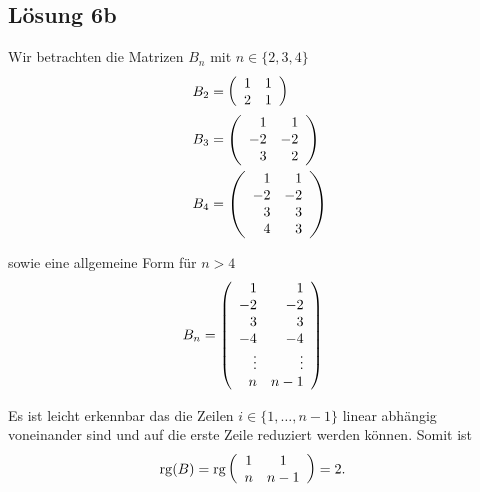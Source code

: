 \documentclass[main.tex]{subfiles}
\begin{document}
\subsection{Lösung 6b}

Wir betrachten die Matrizen $B_n$ mit $n\in \{2, 3, 4\}$
\begin{align*}
    B_2 &= \eqmatrix{rr}{
        1 & 1 \\
        2 & 1 
    } \\
    B_3 &= \eqmatrix{rr}{
         1 &  1 \\
        -2 & -2 \\
         3 &  2
    } \\
    B_4 &= \eqmatrix{rr}{
         1 &  1 \\
        -2 & -2 \\
         3 &  3 \\
         4 &  3
    }
\end{align*}

sowie eine allgemeine Form für $n > 4$
\begin{align*}
    B_n &= \eqmatrix{rr}{
        1 &  1 \\
       -2 & -2 \\
        3 &  3 \\
       -4 & -4 \\
       \vdots & \vdots \\
       n &  n-1 
   }
\end{align*}

Es ist leicht erkennbar das die Zeilen $i \in \{1, \ldots, n-1\}$ linear abhängig voneinander sind und auf die erste Zeile reduziert werden können. 
Somit ist 
\begin{align*}
    \rg (B) &= \rg \eqmatrix{cc}{
        1 &  1 \\
        n &  n-1 
    } = 2.
\end{align*}
\end{document}
